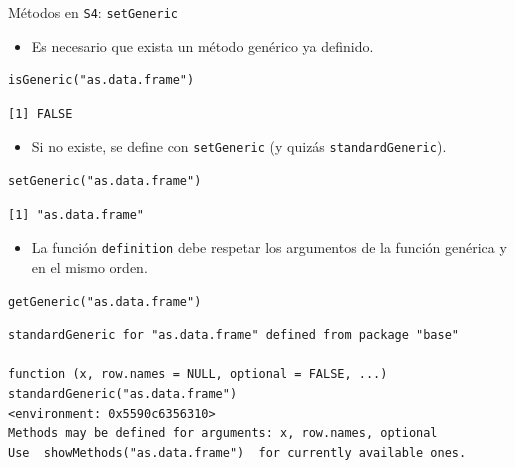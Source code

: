 \documentclass[xcolor={usenames,svgnames,dvipsnames}]{beamer}
\begin{document}
\begin{frame}[label={sec:org03e470e},fragile]{Métodos en \texttt{S4}: \texttt{setGeneric}}
 \begin{itemize}
\item Es necesario que exista un método genérico ya definido.
\end{itemize}
\lstset{language=r,label= ,caption= ,captionpos=b,numbers=none}
\begin{lstlisting}
isGeneric("as.data.frame")
\end{lstlisting}

\begin{verbatim}
[1] FALSE
\end{verbatim}


\begin{itemize}
\item Si no existe, se define con \texttt{setGeneric} (y quizás \texttt{standardGeneric}).
\end{itemize}
\lstset{language=r,label= ,caption= ,captionpos=b,numbers=none}
\begin{lstlisting}
setGeneric("as.data.frame")
\end{lstlisting}

\begin{verbatim}
[1] "as.data.frame"
\end{verbatim}


\begin{itemize}
\item La función \texttt{definition} debe respetar los argumentos de la función genérica y en el mismo orden.
\end{itemize}
\lstset{language=r,label= ,caption= ,captionpos=b,numbers=none}
\begin{lstlisting}
getGeneric("as.data.frame")
\end{lstlisting}

\begin{verbatim}
standardGeneric for "as.data.frame" defined from package "base"

function (x, row.names = NULL, optional = FALSE, ...) 
standardGeneric("as.data.frame")
<environment: 0x5590c6356310>
Methods may be defined for arguments: x, row.names, optional
Use  showMethods("as.data.frame")  for currently available ones.
\end{verbatim}
\end{frame}
\end{document}
